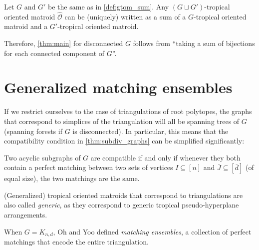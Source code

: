 \documentclass[letterpaper,reqno,11pt]{amsart}
\begin{document}
\begin{proposition}\label{prop:gtom_decomp}
    Let $G$ and $G'$ be the same as in \cref{def:gtom_sum}. Any $(G\sqcup G')$-tropical oriented matroid $\hat{\mathcal{O}}$ can be (uniquely) written as a sum of a $G$-tropical oriented matroid and a $G'$-tropical oriented matroid.
\end{proposition}

Therefore, \cref{thm:main} for disconnected $G$ follows from ``taking a sum of bijections for each connected component of $G$''.

\section{Generalized matching ensembles}\label{sec:gen_ensem}

If we restrict ourselves to the case of triangulations of root polytopes, the graphs that correspond to simplices of the triangulation will all be spanning trees of $G$ (spanning forests if $G$ is disconnected). In particular, this means that the compatibility condition in \cref{thm:subdiv_graphs} can be simplified significantly:

\begin{proposition}
    Two acyclic subgraphs of $G$ are compatible if and only if whenever they both contain a perfect matching between two sets of vertices $I\subseteq [n]$ and $\bar{J}\subseteq [\bar{d}]$ (of equal size), the two matchings are the same.
\end{proposition}

(Generalized) tropical oriented matroids that correspond to triangulations are also called \emph{generic}, as they correspond to generic tropical pseudo-hyperplane arrangements.

When $G = K_{n,d}$, Oh and Yoo defined \emph{matching ensembles}, a collection of perfect matchings that encode the entire triangulation.
\end{document}
